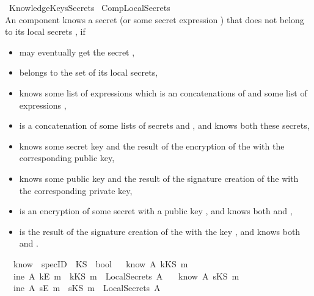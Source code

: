 \begin{isabellebody}\def\isabellecontext{KnowledgeKeysSecrets}
\isamarkuptrue \isadelimtheory
\endisadelimtheory
\isatagtheory
{}\isamarkupfalse \ KnowledgeKeysSecrets\isanewline
{}\ CompLocalSecrets\ \isanewline
{}\endisatagtheory
{\isafoldtheory}\isadelimtheory
\endisadelimtheory
~\\
An component  knows a secret  (or some secret expression )  that does not belong to its local secrets , if
\begin{itemize}
	\item   may eventually get the secret ,
	\item 
	 belongs to the set  of its local secrets, 
	\item  knows some list of expressions  which is an concatenations of  and some list of expressions ,
	\item  is a concatenation of some lists of secrets  and , and  knows both these secrets,
	\item  knows some secret key  and the result of the encryption of the  with the corresponding public key,
	\item  knows some public key  and the result of the signature creation of the  with the corresponding private key,\item  is an encryption of some secret  with a public key , and  knows both  and ,
	\item  is the result of the signature creation of the  with the key , and  knows both  and .
\end{itemize}
\isamarkupfalse \isanewline
\ \ know\ {\isacharcolon}{\isacharcolon}\ {\isachardoublequoteopen}specID\ {\isasymRightarrow}\ KS\ {\isasymRightarrow}\ bool{\isachardoublequoteclose}\isanewline
{}\ \isanewline
\ {\isachardoublequoteopen}know\ A\ {\isacharparenleft}kKS\ m{\isacharparenright}\ {\isacharequal}\ \isanewline
\ \ {\isacharparenleft}{\isacharparenleft}ine\ A\ {\isacharparenleft}kE\ m{\isacharparenright}{\isacharparenright}\ {\isasymor}\ {\isacharparenleft}{\isacharparenleft}kKS\ m{\isacharparenright}\ {\isasymin}\ {\isacharparenleft}LocalSecrets\ A{\isacharparenright}{\isacharparenright}{\isacharparenright}{\isachardoublequoteclose}\ {\isacharbar}\ \isanewline
\ {\isachardoublequoteopen}know\ A\ {\isacharparenleft}sKS\ m{\isacharparenright}\ {\isacharequal}\ \isanewline
\ \ {\isacharparenleft}{\isacharparenleft}ine\ A\ {\isacharparenleft}sE\ m{\isacharparenright}{\isacharparenright}\ {\isasymor}\ {\isacharparenleft}{\isacharparenleft}sKS\ m{\isacharparenright}\ {\isasymin}\ {\isacharparenleft}LocalSecrets\ A{\isacharparenright}{\isacharparenright}{\isacharparenright}{\isachardoublequoteclose}\isanewline

\end{isabellebody}
